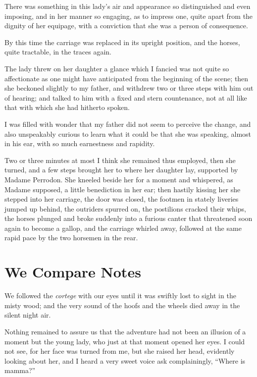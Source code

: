 \documentclass[11pt,twoside,makeidx,hidelinks,]{memoir}
\begin{document}
There was something in this lady's air and appearance so distinguished
and even imposing, and in her manner so engaging, as to impress one,
quite apart from the dignity of her equipage, with a conviction that she
was a person of consequence.

By this time the carriage was replaced in its upright position, and the
horses, quite tractable, in the traces again.

The lady threw on her daughter a glance which I fancied was not quite so
affectionate as one might have anticipated from the beginning of the
scene; then she beckoned slightly to my father, and withdrew two or
three steps with him out of hearing; and talked to him with a fixed and
stern countenance, not at all like that with which she had
hitherto spoken.

I was filled with wonder that my father did not seem to perceive the
change, and also unspeakably curious to learn what it could be that she
was speaking, almost in his ear, with so much earnestness and rapidity.

Two or three minutes at most I think she remained thus employed, then
she turned, and a few steps brought her to where her daughter lay,
supported by Madame Perrodon. She kneeled beside her for a moment and
whispered, as Madame supposed, a little benediction in her ear; then
hastily kissing her she stepped into her carriage, the door was closed,
the footmen in stately liveries jumped up behind, the outriders spurred
on, the postilions cracked their whips, the horses plunged and broke
suddenly into a furious canter that threatened soon again to become a
gallop, and the carriage whirled away, followed at the same rapid pace
by the two horsemen in the rear.

\pbreak{}

\chapter{We Compare Notes}\hypertarget{we-compare-notes}{}\label{we-compare-notes}

We followed the \emph{cortege} with our eyes until it was swiftly lost to
sight in the misty wood; and the very sound of the hoofs and the wheels
died away in the silent night air.

Nothing remained to assure us that the adventure had not been an
illusion of a moment but the young lady, who just at that moment opened
her eyes. I could not see, for her face was turned from me, but she
raised her head, evidently looking about her, and I heard a very sweet
voice ask complainingly, ``Where is mamma?''
\end{document}
